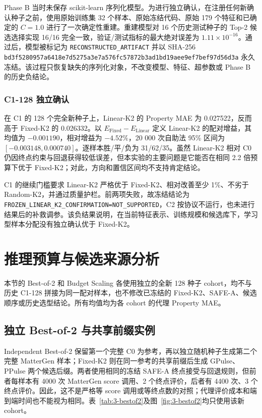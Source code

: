 Phase B 当时未保存 scikit-learn 序列化模型。为进行独立确认，在注册任何新确认种子之前，使用原始训练集 32 个样本、原始冻结代码、原始 179 个特征和已确定的 \(C=1.0\) 进行了一次确定性重建。重建模型对 16 个历史测试种子的 Top-2 候选选择实现 16/16 完全一致，验证/测试指标的最大绝对误差为 \(1.11\times10^{-16}\)。通过后，模型被标记为 \texttt{RECONSTRUCTED\_ARTIFACT} 并以 SHA-256 \texttt{bd3f5280\allowbreak957a6418\allowbreak e7d5275a\allowbreak3e7a576f\allowbreak c57872b3\allowbreak ad1bd19ae\allowbreak e9ef7bef\allowbreak97d56d3a} 永久冻结。该过程只恢复缺失的序列化对象，不改变模型、特征、超参数或 Phase B 的历史负结论。

\subsubsection{C1-128 独立确认}

在 C1 的 128 个完全新种子上，Linear-K2 的 Property MAE 为 0.027522，反而高于 Fixed-K2 的 0.026332。以 \(E_{\mathrm{Fixed}}-E_{\mathrm{Linear}}\) 定义 Linear-K2 的配对增益，其均值为 \(-0.001190\)，相对增益为 \(-4.52\%\)，20 000 次自助法 95\% 区间为 \([-0.003148,0.000740]\)。逐样本胜/平/负为 31/62/35。虽然 Linear-K2 相对 C0 仍因终点约束与回退获得较低误差，但本实验的主要问题是它能否在相同 2.2 倍预算下优于 Fixed-K2；对此，方向和置信区间均不支持肯定结论。

C1 的继续门槛要求 Linear-K2 严格优于 Fixed-K2、相对改善至少 1\%、不劣于 Random-\allowbreak K2，并通过质量护栏。前两项失败，故冻结结论为 \texttt{FROZEN\_LINEAR\_K2\_CONFIRMATION=NOT\_SUP\allowbreak PORTED}，C2 按协议不运行，也未进行结果后的补救调参。该负结果说明，在当前特征表示、训练规模和候选库下，学习型样本分配没有独立确认优于 Fixed-K2。

\section{推理预算与候选来源分析}

本节的 Best-of-2 和 Budget Scaling 各使用独立的全新 128 种子 cohort，均不与历史 C1-128 拼接为同一配对样本，也不修改已冻结的 Fixed-K2、SAFE-A、候选顺序或历史选型结论。所有均值均为各 cohort 的代理 Property MAE。

\subsection{独立 Best-of-2 与共享前缀实例}

Independent Best-of-2 保留第一个完整 C0 为参考，再以独立随机种子生成第二个完整 MatterGen 样本；Fixed-K2 则在同一参考的共享前缀后生成 GPulse、PPulse 两个候选后缀。两者使用相同的冻结 SAFE-A 终点接受与回退规则，但前者每样本有 4000 次 MatterGen score 调用、2 个终点评价，后者有 4400 次、3 个终点评价。因此，这不是严格等 score 调用或等终点数的对照；代理评价成本和端到端时间也不能视为相同。表~\ref{tab:3-bestof2}及图~\ref{fig:3-bestof2}均只使用该新 cohort。

